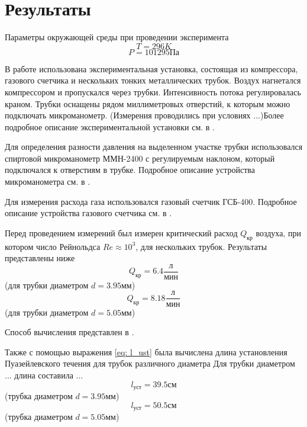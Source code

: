 \section{Результаты}
Параметры окружающей среды при проведении эксперимента
\[T = 296K\]
\[P = 101295\text{Па}\]

В работе использована экспериментальная установка, состоящая из компрессора, газового счетчика и нескольких тонких металлических трубок. Воздух нагнетался компрессором и пропускался через трубки. Интенсивность потока регулировалась краном. Трубки оснащены рядом миллиметровых отверстий, к которым можно подключать микроманометр. (Измерения проводились при условиях ...)Более подробное описание экспериментальной установки см. в .

Для определения разности давления на выделенном участке трубки использовался спиртовой микроманометр ММН-2400 с регулируемым наклоном, который подключался к отверстиям в трубке. Подробное описание устройства микроманометра см. в .

Для измерения расхода газа использовался газовый счетчик ГСБ-400. Подробное описание устройства газового счетчика см. в .

Перед проведением измерений был измерен критический расход $Q_\text{кр}$ воздуха, при котором число Рейнольдса $Re \approx 10^3$, для нескольких трубок.
Результаты представлены ниже
\[Q_\text{кр} = 6.4\frac{\text{л}}{\text{мин}} \](для трубки диаметром $d = 3.95\text{мм}$)
\[Q_\text{кр} = 8.18\frac{\text{л}}{\text{мин}} \](для трубки диаметром $d = 5.05\text{мм}$)

Способ вычисления представлен в .

Также с помощью выражения \eqref{eq: l_ust} была вычислена длина установления Пуазейлевского течения для трубок различного диаметра
Для трубки диаметром ... длина составила ...
\[ l_\text{уст} = 39.5\text{см}\] (трубка диаметром $d = 3.95\text{мм}$)
\[ l_\text{уст} = 50.5\text{см}\] (трубка диаметром $d = 5.05\text{мм}$)

